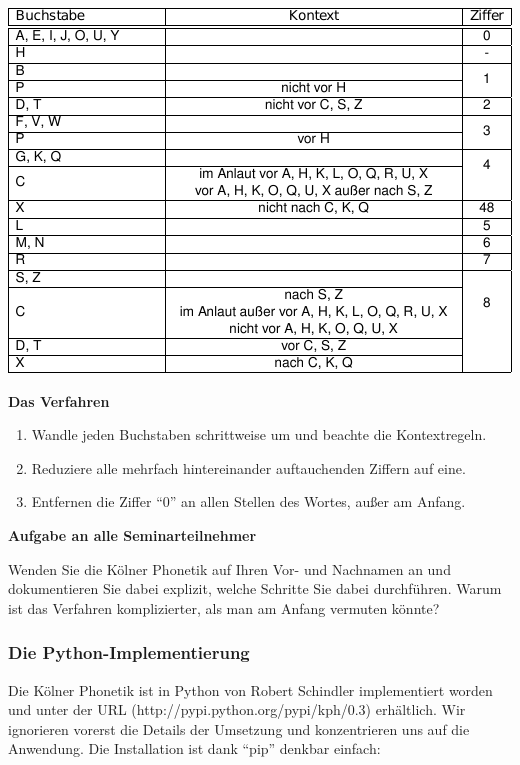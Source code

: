 \includegraphics[width=\textwidth]{img/kphon.pdf}


\vspace{0.5cm}\par\noindent\textbf{Das Verfahren}\vspace{0.5cm}

\begin{enumerate}
\itemsep1pt\parskip0pt
\item
  Wandle jeden Buchstaben schrittweise um und beachte die Kontextregeln.
\item
  Reduziere alle mehrfach hintereinander auftauchenden Ziffern auf eine.
\item
  Entfernen die Ziffer ``0'' an allen Stellen des Wortes, außer am
  Anfang.
\end{enumerate}


\vspace{0.5cm}\par\noindent\textbf{Aufgabe an alle Seminarteilnehmer}\vspace{0.5cm}

Wenden Sie die Kölner Phonetik auf Ihren Vor- und Nachnamen an und
dokumentieren Sie dabei explizit, welche Schritte Sie dabei durchführen.
Warum ist das Verfahren komplizierter, als man am Anfang vermuten
könnte?


\subsubsection{\texorpdfstring{{Die
Python-Implementierung}}{Die Python-Implementierung}}

Die Kölner Phonetik ist in Python von Robert Schindler implementiert
worden und unter der URL (http://pypi.python.org/pypi/kph/0.3)
erhältlich. Wir ignorieren vorerst die Details der Umsetzung und
konzentrieren uns auf die Anwendung. Die Installation ist dank ``pip''
denkbar einfach:

